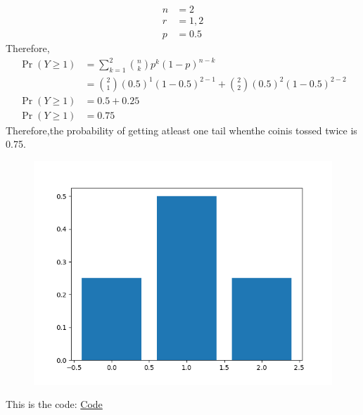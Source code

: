 \documentclass[12pt,twocolumn]{article}
\begin{document}
\begin{align}
	n &= 2\\
	r &= 1,2\\
	p &= 0.5
\end{align}
Therefore,
\begin{align}
	\Pr(Y\geq 1)&=\sum_{k=1}^2 \binom nk p^k(1-p)^{n-k}\\
	&=\binom 21(0.5)^1(1-0.5)^{2-1}+\binom 22 (0.5)^2(1-0.5)^{2-2}\\
	\Pr(Y\geq 1)&=0.5+0.25\\
	\Pr(Y\geq 1)&= 0.75
\end{align}
Therefore,the probability of getting atleast one tail whenthe coinis tossed twice is 0.75.\\
\begin{table}[h]
	
\end{table}

\begin{figure}[h]
    \centering
\includegraphics[width=\columnwidth]{fig/11.16.3.2.png}
\end{figure}
This is the code: \href{https://github.com/ShreyaniReddy/IITH-FWC/blob/main/probability/11.16.3.2/codes/11.16.3.2.py}{Code}
\end{document}

